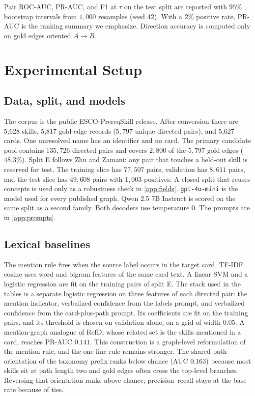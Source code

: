 \documentclass{ws-ijait}
\begin{document}
Pair {ROC}-{AUC}, {PR}-{AUC}, and {F1} at $\tau$ on the test split
are reported with $95$\% bootstrap intervals from $1{,}000$ resamples
(seed $42$).
With a $2$\% positive rate, {PR}-{AUC} is the ranking summary we
emphasize.
Direction accuracy is computed only on gold edges oriented
$A\to B$.

\section{Experimental Setup}
\label{sec:setup}

\subsection{Data, split, and models}
The corpus is the public {ESCO-PrereqSkill} release\cite{Le_2025}.
After conversion there are 5,628 skills, 5,817 gold-edge records
($5{,}797$ unique directed pairs), and 5,627 cards.
One unresolved name has an identifier and no card.
The primary candidate pool contains $135{,}726$ directed pairs and
covers $2{,}800$ of the $5{,}797$ gold edges ($48.3$\%).
Split E follows Zhu and Zamani\cite{Zhu_2022}: any pair that touches
a held-out skill is reserved for test.
The training slice has $77{,}507$ pairs, validation has $8{,}611$
pairs, and the test slice has $49{,}608$ pairs with $1{,}003$
positives.
A closed split that reuses concepts is used only as a robustness
check in \ref{app:fields}.
\texttt{gpt-4o-mini} is the model used for every published graph.
{Qwen} 2.5 7B Instruct is scored on the same split as a second
family.
Both decoders use temperature $0$.
The prompts are in \ref{app:prompts}.

\subsection{Lexical baselines}
The mention rule fires when the source label occurs in the target
card.
{TF}-{IDF} cosine uses word and bigram features of the same card
text.
A linear {SVM} and a logistic regression are fit on the training
pairs of split E.
The stack used in the tables is a separate logistic regression on
three features of each directed pair: the mention indicator,
verbalized confidence from the labels prompt, and verbalized
confidence from the card-plus-path prompt.
Its coefficients are fit on the training pairs, and its threshold
is chosen on validation alone, on a grid of width $0.05$.
A mention-graph analogue of RefD, whose related set is the skills
mentioned in a card, reaches {PR}-{AUC} $0.141$.
This construction is a graph-level reformulation of the mention
rule, and the one-line rule remains stronger.
The shared-path orientation of the taxonomy prefix ranks below
chance ({AUC} $0.163$) because most skills sit at path length two
and gold edges often cross the top-level branches.
Reversing that orientation ranks above chance; precision--recall
stays at the base rate because of ties.
\end{document}
